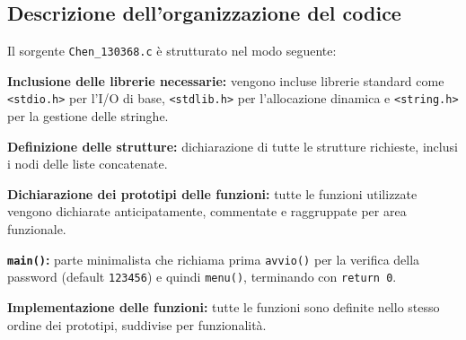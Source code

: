 \documentclass[11pt,a4paper,oneside,openany]{book}
\newenvironment{listacomp}{%
    \small
    \begin{list}{\textendash}{%
        \setlength{\topsep}{2pt}%
        \setlength{\partopsep}{0pt}%
        \setlength{\itemsep}{1pt}%
        \setlength{\parsep}{0pt}%
        \setlength{\leftmargin}{1.2em}%
    }%
}{%
    \end{list}%
}
\begin{document}
\subsection{Descrizione dell'organizzazione del codice}
Il sorgente \texttt{Chen\_130368.c} è strutturato nel modo seguente:
\begin{listacomp}
    \item \textbf{Inclusione delle librerie necessarie:} vengono incluse librerie standard come \texttt{<stdio.h>} per l'I/O di base, \texttt{<stdlib.h>} per l'allocazione dinamica e \texttt{<string.h>} per la gestione delle stringhe.
    \item \textbf{Definizione delle strutture:} dichiarazione di tutte le strutture richieste, inclusi i nodi delle liste concatenate.
    \item \textbf{Dichiarazione dei prototipi delle funzioni:} tutte le funzioni utilizzate vengono dichiarate anticipatamente, commentate e raggruppate per area funzionale.
    \item \textbf{\texttt{main()}:} parte minimalista che richiama prima \texttt{avvio()} per la verifica della password (default \texttt{123456}) e quindi \texttt{menu()}, terminando con \texttt{return 0}.
    \item \textbf{Implementazione delle funzioni:} tutte le funzioni sono definite nello stesso ordine dei prototipi, suddivise per funzionalità.
\end{listacomp}

\end{document}

